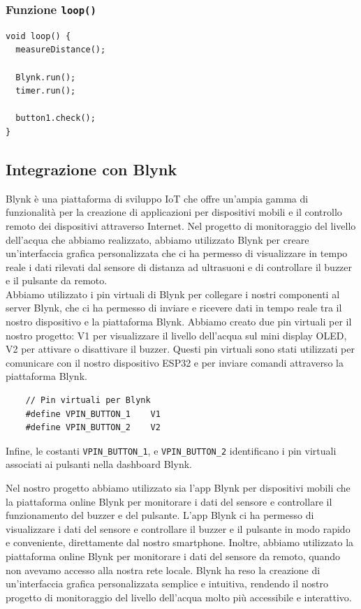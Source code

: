\subsubsection{Funzione \texttt{loop()}}

\begin{verbatim}
void loop() {
  measureDistance();

  Blynk.run();
  timer.run(); 

  button1.check();
}
\end{verbatim}

\subsection{Integrazione con Blynk}

Blynk è una piattaforma di sviluppo IoT che offre un'ampia gamma di funzionalità per la creazione di applicazioni per dispositivi mobili e il controllo remoto dei dispositivi attraverso Internet. Nel progetto di monitoraggio del livello dell'acqua che abbiamo realizzato, abbiamo utilizzato Blynk per creare un'interfaccia grafica personalizzata che ci ha permesso di visualizzare in tempo reale i dati rilevati dal sensore di distanza ad ultrasuoni e di controllare il buzzer e il pulsante da remoto. \\

Abbiamo utilizzato i pin virtuali di Blynk per collegare i nostri componenti al server Blynk, che ci ha permesso di inviare e ricevere dati in tempo reale tra il nostro dispositivo e la piattaforma Blynk. Abbiamo creato due pin virtuali per il nostro progetto: V1 per visualizzare il livello dell'acqua sul mini display OLED, V2 per attivare o disattivare il buzzer. Questi pin virtuali sono stati utilizzati per comunicare con il nostro dispositivo ESP32 e per inviare comandi attraverso la piattaforma Blynk. 
\begin{multicols}{2}
    \begin{verbatim}
    // Pin virtuali per Blynk
    #define VPIN_BUTTON_1    V1 
    #define VPIN_BUTTON_2    V2
    \end{verbatim}
    \columnbreak
    Infine, le costanti \texttt{VPIN_BUTTON_1}, e  \texttt{VPIN_BUTTON_2} identificano i pin virtuali associati ai pulsanti nella dashboard Blynk.
\end{multicols}

Nel nostro progetto abbiamo utilizzato sia l'app Blynk per dispositivi mobili che la piattaforma online Blynk per monitorare i dati del sensore e controllare il funzionamento del buzzer e del pulsante. L'app Blynk ci ha permesso di visualizzare i dati del sensore e controllare il buzzer e il pulsante in modo rapido e conveniente, direttamente dal nostro smartphone. Inoltre, abbiamo utilizzato la piattaforma online Blynk per monitorare i dati del sensore da remoto, quando non avevamo accesso alla nostra rete locale. Blynk ha reso la creazione di un'interfaccia grafica personalizzata semplice e intuitiva, rendendo il nostro progetto di monitoraggio del livello dell'acqua molto più accessibile e interattivo.

